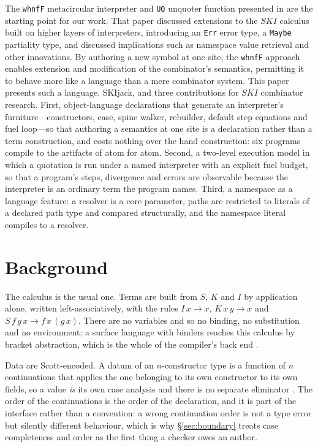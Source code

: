 \documentclass[english,submission,code=tt]{programming}
\begin{document}
The \texttt{whnfF} metacircular interpreter and \texttt{UQ} unquoter 
function presented in \citet{Davis2027} are the starting point for our 
work.  That paper discussed extensions to the $SKI$ calculus built on
higher layers of interpreters, introducing an \texttt{Err} error type,
a \texttt{Maybe} partiality type, and discussed implications such as
namespace value retrieval and other innovations.  By authoring a new
symbol at one site, the \texttt{whnfF} approach enables extension and 
modification of the combinator's semantics, permitting it to behave more
like a language than a mere combinator system.  This paper presents
such a language, SKIjack, and three contributions for $SKI$ combinator
research.  First, object-language declarations that generate an
interpreter's furniture---constructors, case, spine walker,
rebuilder, default step equations and fuel loop---so that authoring a
semantics at one site is a declaration rather than a term construction,
and costs nothing over the hand construction: six programs compile to
the artifacts of \citet{Davis2027} atom for atom.  Second, a two-level
execution model in which a quotation is run under a named interpreter
with an explicit fuel budget, so that a program's steps, divergence and
errors are observable because the interpreter is an ordinary term the
program names.  Third, a namespace as a language feature: a resolver is
a core parameter, paths are restricted to literals of a declared path
type and compared structurally, and the namespace literal compiles to a
resolver.

\section{Background}\label{sec:background}

The calculus is the usual one.  Terms are built from $S$,
$K$ and $I$ by application alone, written
left-associatively, with the rules $I\,x \to x$, $K\,x\,y \to x$ and
$S\,f\,g\,x \to f\,x\,(g\,x)$.  There are no variables and so no
binding, no substitution and no environment; a surface language with
binders reaches this calculus by bracket abstraction, which is the whole
of the compiler's back end \citep{Turner1979b}.

Data are Scott-encoded.  A datum of an $n$-constructor type is a function
of $n$ continuations that applies the one belonging to its own
constructor to its own fields, so a value \emph{is} its own case
analysis and there is no separate eliminator
\citep{Scott1962,Jansen2013,BohmBerarducci1985}.  The order of the
continuations is the order of the declaration, and it is part of the
interface rather than a convention: a wrong continuation order is not a
type error but silently different behaviour, which is why
\S\ref{sec:boundary} treats case completeness and order as the first
thing a checker owes an author.
\end{document}

